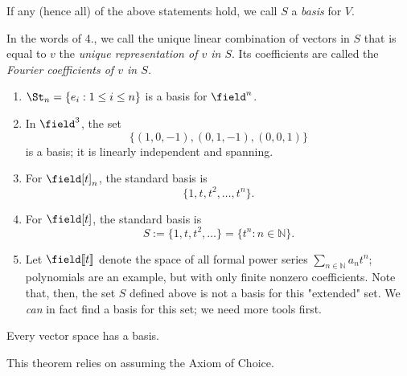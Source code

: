 \begin{definition}[Basis]
    If any (hence all) of the above statements hold, we call $S$ a \emph{basis} for $V$.

    In the words of 4., we call the unique linear combination of vectors in $S$ that is equal to $v$ the \emph{unique representation of $v$ in $S$}. Its coefficients are called the \emph{Fourier coefficients of $v$ in $S$.}
\end{definition}

\begin{example}
    \begin{enumerate}
        \item $\St_n = \{e_i : 1 \leq i \leq n\}$ is a basis for $\field^n$.
        \item In $\field^3$, the set \[
        \{(1, 0, -1), (0, 1, -1), (0,0,1)\}    
        \]
        is a basis; it is linearly independent and spanning.
        \item For $\field[t]_n$, the standard basis is \[
        \{1, t, t^2, \dots, t^n\}.
        \]
        \item For $\field[t]$, the standard basis is \[
        S := \{1, t, t^2, \dots\} = \{t^n : n \in \mathbb{N}\}.
        \]
        \item Let $\field[\![t]\!]$ denote the space of all formal power series $\sum_{n \in \mathbb{N}} a_n t^n$; polynomials are an example, but with only finite nonzero coefficients. Note that, then, the set $S$ defined above is not a basis for this "extended" set. We \emph{can} in fact find a basis for this set; we need more tools first.
    \end{enumerate}
\end{example}

\begin{theorem}
    Every vector space has a basis.
\end{theorem}

\begin{remark}
    This theorem relies on assuming the Axiom of Choice.
\end{remark}
